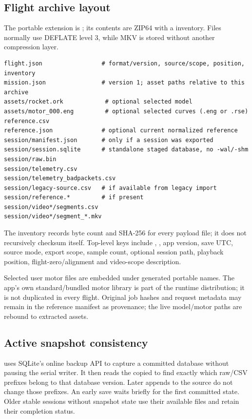 \subsection{Flight archive layout}
The portable extension is ; its contents are ZIP64 with a
 inventory. Files normally use DEFLATE level 3, while MKV is
stored without another compression layer.

\begin{lstlisting}
flight.json                 # format/version, source/scope, position, inventory
mission.json                # version 1; asset paths relative to this archive
assets/rocket.ork            # optional selected model
assets/motor_000.eng         # optional selected curves (.eng or .rse)
reference.csv
reference.json              # optional current normalized reference
session/manifest.json       # only if a session was exported
session/session.sqlite      # standalone staged database, no -wal/-shm
session/raw.bin
session/telemetry.csv
session/telemetry_badpackets.csv
session/legacy-source.csv   # if available from legacy import
session/reference.*         # if present
session/video*/segments.csv
session/video*/segment_*.mkv
\end{lstlisting}
The inventory records byte count and SHA-256 for every payload file; it does not
recursively checksum itself. Top-level keys include
, ,
app version, save UTC, source mode, export scope, sample count, optional session
path, playback position, flight-zero/alignment and video-scope description.

Selected user motor files are embedded under generated portable names. The
app's own standard/bundled motor library is part of the runtime distribution;
it is not duplicated in every flight. Original job hashes and request metadata
may remain in the reference manifest as provenance; the live model/motor paths
are rebound to extracted assets.

\subsection{Active snapshot consistency}

 uses SQLite's online backup API to capture a committed
database without pausing the serial writer. It then reads the copied
 to find exactly which raw/CSV prefixes belong to that
database version. Later appends to the source do not change those prefixes.
An early save waits briefly for the first committed state. Older stable sessions
without snapshot state use their available files and retain their completion
status.

